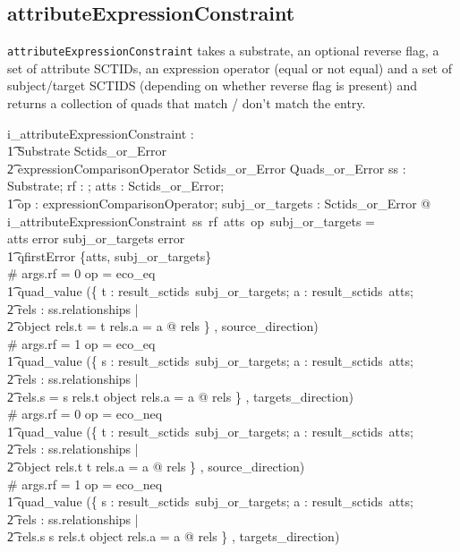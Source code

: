\documentclass{article}
\def\spec#1{{\tt #1}}
\begin{document}
\subsection{attributeExpressionConstraint}
\spec{attributeExpressionConstraint} takes a substrate, an optional reverse flag, a set of attribute SCTIDs, an expression operator (equal or not equal) and a set of subject/target SCTIDS (depending on 
whether reverse flag is present) and returns a collection of quads that match / don't match the entry.
\begin{gendef}
   i\_attributeExpressionConstraint : \\ 
\t1 Substrate \fun \optional[reverseFlag] \fun Sctids\_or\_Error \fun \\
\t2 expressionComparisonOperator \fun Sctids\_or\_Error \fun Quads\_or\_Error
\where
   \forall ss : Substrate;  rf : \optional[reverseFlag]; atts : Sctids\_or\_Error; \\
\t1 op : expressionComparisonOperator; subj\_or\_targets : Sctids\_or\_Error @ \\
   i\_attributeExpressionConstraint~ss~rf~atts~op~subj\_or\_targets = \\
 \IF atts \in \ran error \lor subj\_or\_targets \in \ran error \\
\t1 \THEN qfirstError \{atts, subj\_or\_targets\} \\
 \ELSE \IF \# args.rf = 0 \land op = eco\_eq \THEN \\
\t1 quad\_value (\{ t : result\_sctids~subj\_or\_targets; a : result\_sctids~atts; \\
\t2 rels : ss.relationships |\\
\t2 object \inv rels.t = t \land rels.a = a @ rels \} , source\_direction) \\
\ELSE \IF \# args.rf = 1 \land op = eco\_eq \THEN \\
\t1 quad\_value (\{ s : result\_sctids~subj\_or\_targets; a : result\_sctids~atts; \\
\t2 rels : ss.relationships |\\
\t2 rels.s = s \land rels.t \in \ran object \land rels.a = a @ rels \} , targets\_direction) \\
 \ELSE \IF \# args.rf = 0 \land op = eco\_neq \THEN \\
\t1 quad\_value (\{ t : result\_sctids~subj\_or\_targets; a : result\_sctids~atts; \\
\t2 rels : ss.relationships |\\
\t2 object \inv rels.t \neq t \land rels.a = a @ rels \} , source\_direction) \\
 \ELSE \IF \# args.rf = 1 \land op = eco\_neq \THEN \\
\t1 quad\_value (\{ s : result\_sctids~subj\_or\_targets; a : result\_sctids~atts; \\
\t2 rels : ss.relationships |\\
\t2 rels.s \neq s \land rels.t \in \ran object \land rels.a = a @ rels \} , targets\_direction) \\
\end{gendef}
\end{document}
